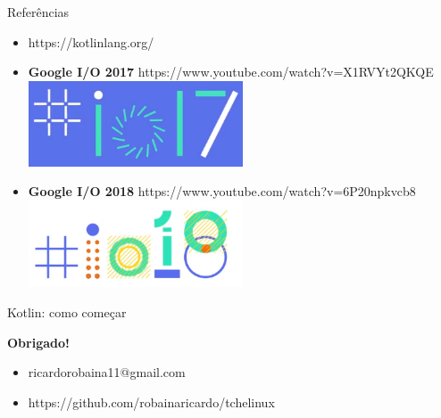\documentclass{beamer}
\begin{document}
\begin{frame}{Referências}
	
	
			\begin{itemize}
				\item https://kotlinlang.org/
				
				\item \textbf{Google I/O 2017} https://www.youtube.com/watch?v=X1RVYt2QKQE
				\\
				\includegraphics[width=0.5\textwidth]{io17.png}
			
				\item \textbf{Google I/O 2018}  https://www.youtube.com/watch?v=6P20npkvcb8
				\\
				\includegraphics[width=0.5\textwidth]{io18.png}
				
				
			\end{itemize}

	
	
\end{frame}

\begin{frame}{Kotlin: como começar}
	
		\newline
		\begin{center}
			{\Huge  \textbf{Obrigado!} \\}
		\end{center}
		
		{\normalsize 
			\begin{itemize}
				\item ricardorobaina11@gmail.com 
				\item https://github.com/robainaricardo/tchelinux \\ \newline   
			\end{itemize}	
		}
		\maketitle
	
\end{frame}
\end{document}
